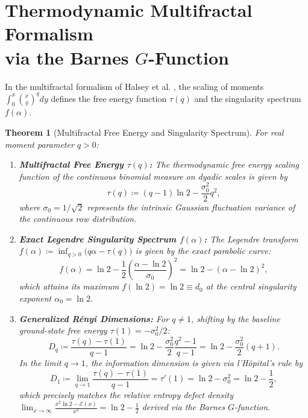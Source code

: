 \documentclass[11pt,a4paper]{article}
\theoremstyle{plain}
\newtheorem{theorem}{Theorem}[section]
\theoremstyle{definition}
\theoremstyle{remark}
\numberwithin{equation}{section}
\begin{document}
\section[Multifractal Formalism via Barnes G-Function]{Thermodynamic Multifractal Formalism \\ via the Barnes \texorpdfstring{$G$}{G}-Function}

In the multifractal formalism of Halsey et al. \cite{falconer2014}, the scaling of moments $\int_0^x \binom{x}{y}^q dy$ defines the free energy function $\tau(q)$ and the singularity spectrum $f(\alpha)$.

\begin{theorem}[Multifractal Free Energy and Singularity Spectrum]
\label{thm:multifractal}
For real moment parameter $q > 0$:
\begin{enumerate}
    \item \textbf{Multifractal Free Energy $\tau(q)$:}
    The thermodynamic free energy scaling function of the continuous binomial measure on dyadic scales is given by
    \begin{equation}
    \tau(q) \coloneqq (q - 1)\ln 2 - \frac{\sigma_0^2}{2} q^2,
    \end{equation}
    where $\sigma_0 = 1/\sqrt{2}$ represents the intrinsic Gaussian fluctuation variance of the continuous row distribution.
    \item \textbf{Exact Legendre Singularity Spectrum $f(\alpha)$:}
    The Legendre transform $f(\alpha) \coloneqq \inf_{q > 0}\big(q\alpha - \tau(q)\big)$ is given by the exact parabolic curve:
    \begin{equation}
    f(\alpha) = \ln 2 - \frac{1}{2}\left( \frac{\alpha - \ln 2}{\sigma_0} \right)^2 = \ln 2 - (\alpha - \ln 2)^2,
    \end{equation}
    which attains its maximum $f(\ln 2) = \ln 2 \equiv d_0$ at the central singularity exponent $\alpha_0 = \ln 2$.
    \item \textbf{Generalized R\'enyi Dimensions:}
    For $q \ne 1$, shifting by the baseline ground-state free energy $\tau(1) = -\sigma_0^2/2$:
    \begin{equation}
    D_q \coloneqq \frac{\tau(q) - \tau(1)}{q-1} = \ln 2 - \frac{\sigma_0^2}{2}\frac{q^2 - 1}{q-1} = \ln 2 - \frac{\sigma_0^2}{2}(q+1).
    \end{equation}
    In the limit $q \to 1$, the information dimension is given via l'H\^opital's rule by
    \begin{equation}
    D_1 \coloneqq \lim_{q \to 1} \frac{\tau(q) - \tau(1)}{q-1} = \tau'(1) = \ln 2 - \sigma_0^2 = \ln 2 - \frac{1}{2},
    \end{equation}
    which precisely matches the relative entropy defect density $\lim_{x\to\infty} \frac{x^2 \ln 2 - \mathcal{E}(x)}{x^2} = \ln 2 - \frac{1}{2}$ derived via the Barnes $G$-function.
\end{enumerate}
\end{theorem}
\end{document}
